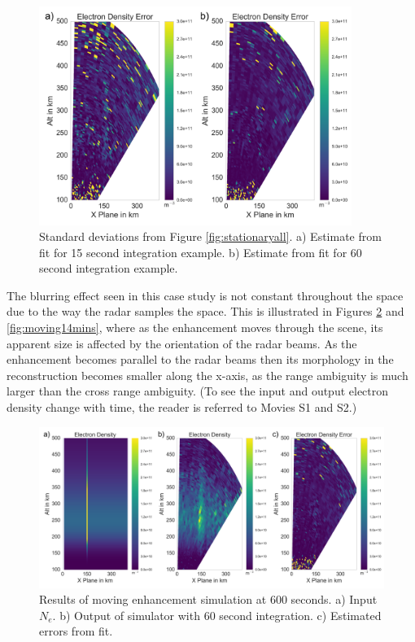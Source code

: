 \documentclass[draft,ras]{agutex}
\begin{document}
\begin{article}
\begin{figure}[!t]
\centering
\includegraphics[width=4in]{Errorstationary}
\caption{Standard deviations from Figure \ref{fig:stationaryall}. a)  Estimate from fit for 15 second integration example. b) Estimate from fit for 60 second integration example.}
\label{fig:errorstationaryall}
\end{figure}

The blurring effect seen in this case study is not constant throughout the space due to the way the radar samples the space. This is illustrated in Figures \ref{fig:moving10mins} and \ref{fig:moving14mins}, where as the enhancement moves through the scene, its apparent size is affected by the orientation of the radar beams. As the enhancement becomes parallel to the radar beams then its morphology in the reconstruction becomes smaller along the x-axis, as the range ambiguity is much larger than the cross range ambiguity. (To see the input and output electron density change with time, the reader is referred to Movies S1 and S2.)

\begin{figure}[!t]
\centering
\includegraphics[width=6in]{moving6mins}
\caption{Results of moving enhancement simulation at 600 seconds. a) Input $N_e$. b) Output of simulator with 60 second integration. c) Estimated errors from fit.}
\label{fig:moving10mins}
\end{figure}



\end{article}
\end{document}
